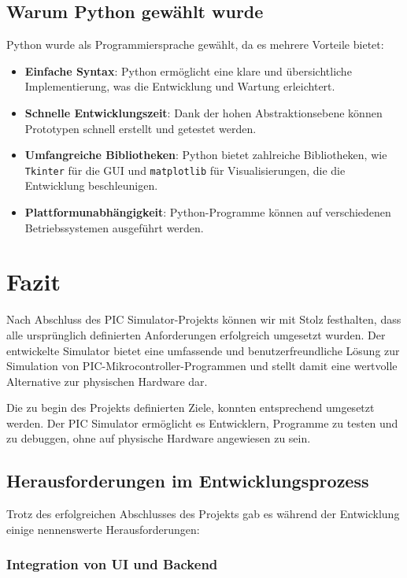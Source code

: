 \documentclass[a4paper,11pt]{report}
\begin{document}
\section{Warum Python gewählt wurde}
Python wurde als Programmiersprache gewählt, da es mehrere Vorteile bietet:
\begin{itemize}
    \item \textbf{Einfache Syntax}: Python ermöglicht eine klare und übersichtliche Implementierung, was die Entwicklung und Wartung erleichtert.
    \item \textbf{Schnelle Entwicklungszeit}: Dank der hohen Abstraktionsebene können Prototypen schnell erstellt und getestet werden.
    \item \textbf{Umfangreiche Bibliotheken}: Python bietet zahlreiche Bibliotheken, wie \texttt{Tkinter} für die GUI und \texttt{matplotlib} für Visualisierungen, die die Entwicklung beschleunigen.
    \item \textbf{Plattformunabhängigkeit}: Python-Programme können auf verschiedenen Betriebssystemen ausgeführt werden.
\end{itemize}


\chapter{Fazit}

Nach Abschluss des PIC Simulator-Projekts können wir mit Stolz festhalten, dass alle ursprünglich definierten Anforderungen erfolgreich umgesetzt wurden. Der entwickelte Simulator bietet eine umfassende und benutzerfreundliche Lösung zur Simulation von PIC-Mikrocontroller-Programmen und stellt damit eine wertvolle Alternative zur physischen Hardware dar.

Die zu begin des Projekts definierten Ziele, konnten entsprechend umgesetzt werden. Der PIC Simulator ermöglicht es Entwicklern, Programme zu testen und zu debuggen, ohne auf physische Hardware angewiesen zu sein.

\section{Herausforderungen im Entwicklungsprozess}

Trotz des erfolgreichen Abschlusses des Projekts gab es während der Entwicklung einige nennenswerte Herausforderungen:

\subsection{Integration von UI und Backend}
\end{document}
